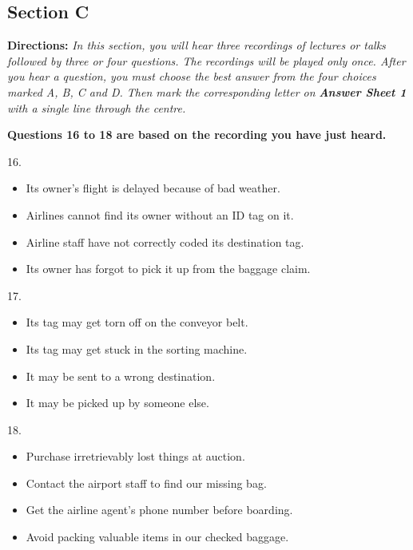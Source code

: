 \documentclass[UTF8,11pt]{ctexart}
\begin{document}
\subsection*{\textbf{Section C}}


\textbf{Directions:}\textit{ In this section, you will hear three recordings of lectures or talks followed by three or four questions. The} \textit{recordings will be played only once. After you hear a question, you must choose the best answer from the four choices} \textit{marked A, B, C and D. Then mark the corresponding letter on }\textbf{\textit{Answer Sheet 1}}\textit{ with a single line through the centre.}


\textbf{Questions 16 to 18 are based on the recording you have just heard.}


16.


\begin{itemize}[leftmargin=2em,itemsep=.2em,topsep=.4em]\item[A.] Its owner’s flight is delayed because of bad weather.
\item[B.] Airlines cannot find its owner without an ID tag on it.
\item[C.] Airline staff have not correctly coded its destination tag.
\item[D.] Its owner has forgot to pick it up from the baggage claim.
\end{itemize}

17.


\begin{itemize}[leftmargin=2em,itemsep=.2em,topsep=.4em]\item[A.] Its tag may get torn off on the conveyor belt.
\item[B.] Its tag may get stuck in the sorting machine.
\item[C.] It may be sent to a wrong destination.
\item[D.] It may be picked up by someone else.
\end{itemize}

18.


\begin{itemize}[leftmargin=2em,itemsep=.2em,topsep=.4em]\item[A.] Purchase irretrievably lost things at auction.
\item[B.] Contact the airport staff to find our missing bag.
\item[C.] Get the airline agent’s phone number before boarding.
\item[D.] Avoid packing valuable items in our checked baggage.
\end{itemize}
\end{document}
